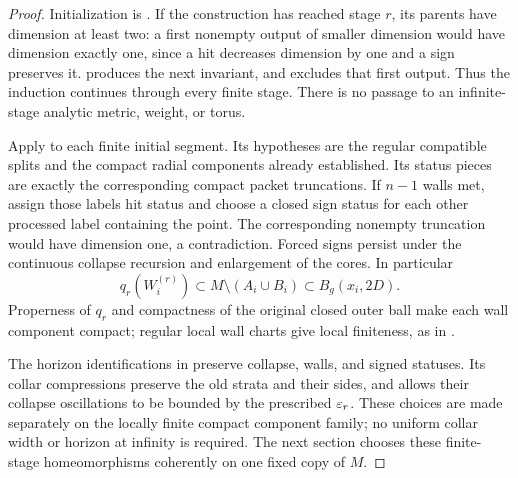 \begin{proof}
Initialization is . If the construction has
reached stage $r$, its parents have dimension at least two: a first
nonempty output of smaller dimension would have dimension exactly
one, since a hit decreases dimension by one and a sign preserves it.
 produces the next invariant, and
 excludes that first output. Thus the
induction continues through every finite stage. There is no passage
to an infinite-stage analytic metric, weight, or torus.

Apply  to each finite initial segment.
Its hypotheses are the regular compatible splits and the compact
radial components already established. Its status pieces are exactly
the corresponding compact packet truncations. If $n-1$ walls met,
assign those labels hit status and choose a closed sign status for
each other processed label containing the point. The corresponding
nonempty truncation would have dimension one, a contradiction.
Forced signs persist under the continuous collapse recursion and
enlargement of the cores. In particular
\[
 q_r(W_i^{(r)})\subset M\setminus(A_i\cup B_i)
                         \subset B_g(x_i,2D).
\]
Properness of $q_r$ and compactness of the original closed outer ball
make each wall component compact; regular local wall charts give
local finiteness, as in .

The horizon identifications in  preserve
collapse, walls, and signed statuses. Its collar compressions preserve
the old strata and their sides, and 
allows their collapse oscillations to be bounded by the prescribed
$\varepsilon_r$. These choices are made separately on the locally finite
compact component family; no uniform collar width or horizon at
infinity is required. The next section chooses these finite-stage
homeomorphisms coherently on one fixed copy of $M$.
\end{proof}
